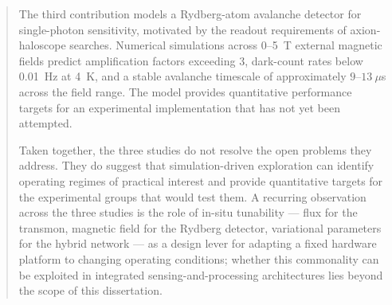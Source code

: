 \begin{abstract}
The third contribution models a Rydberg-atom avalanche detector for single-photon sensitivity, motivated by the readout requirements of axion-haloscope searches. Numerical simulations across 0--5~T external magnetic fields predict amplification factors exceeding 3, dark-count rates below 0.01~Hz at 4~K, and a stable avalanche timescale of approximately $9$--$13~\mu$s across the field range. The model provides quantitative performance targets for an experimental implementation that has not yet been attempted.

Taken together, the three studies do not resolve the open problems they address. They do suggest that simulation-driven exploration can identify operating regimes of practical interest and provide quantitative targets for the experimental groups that would test them. A recurring observation across the three studies is the role of in-situ tunability --- flux for the transmon, magnetic field for the Rydberg detector, variational parameters for the hybrid network --- as a design lever for adapting a fixed hardware platform to changing operating conditions; whether this commonality can be exploited in integrated sensing-and-processing architectures lies beyond the scope of this dissertation.
\end{abstract}

